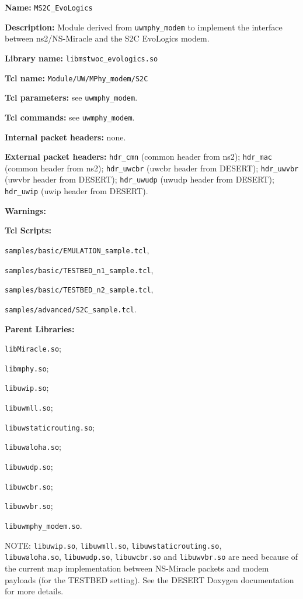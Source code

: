 \begin{description}
   \item {\bf Name:} {\tt MS2C\_EvoLogics}
   \item {\bf Description:} Module derived from {\tt uwmphy\_modem} to implement the interface between ns2/NS-Miracle and the S2C EvoLogics modem.
   \item {\bf Library name:} {\tt libmstwoc\_evologics.so}
   \item {\bf Tcl name:} {\tt Module/UW/MPhy\_modem/S2C}
   \item {\bf Tcl parameters:} see {\tt uwmphy\_modem}.
   \item {\bf Tcl commands:} see {\tt uwmphy\_modem}.
   \item {\bf Internal packet headers:} none.
   \item {\bf External packet headers:} {\tt hdr\_cmn} (common header from ns2); {\tt hdr\_mac} (common header from ns2); {\tt hdr\_uwcbr} (uwcbr header from DESERT); {\tt hdr\_uwvbr} (uwvbr header from DESERT); {\tt hdr\_uwudp} (uwudp header from DESERT); {\tt hdr\_uwip} (uwip header from DESERT).
   \item {\bf Warnings:}
   \item {\bf Tcl Scripts:} 
         \begin{description}
		     \item {\tt samples/basic/EMULATION\_sample.tcl},
		     \item {\tt samples/basic/TESTBED\_n1\_sample.tcl}, 
		     \item {\tt samples/basic/TESTBED\_n2\_sample.tcl},
		     \item {\tt samples/advanced/S2C\_sample.tcl}.
	     \end{description}
   \item {\bf Parent Libraries:}
    \begin{description}
		\item {\tt libMiracle.so};
      \item {\tt libmphy.so};
      \item {\tt libuwip.so};
      \item {\tt libuwmll.so};
      \item {\tt libuwstaticrouting.so};
      \item {\tt libuwaloha.so};
      \item {\tt libuwudp.so};
      \item {\tt libuwcbr.so};
      \item {\tt libuwvbr.so};
      \item {\tt libuwmphy\_modem.so}.
	   \end{description} 
      NOTE: {\tt libuwip.so}, {\tt libuwmll.so}, {\tt libuwstaticrouting.so}, \\ {\tt libuwaloha.so}, {\tt libuwudp.so}, {\tt libuwcbr.so} and {\tt libuwvbr.so} are need because of the current map implementation between NS-Miracle packets and modem payloads (for the TESTBED setting). See the DESERT Doxygen documentation for more details.
\end{description}

